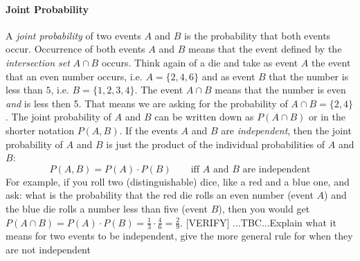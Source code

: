 \paragraph{Joint Probability}
A \emph{joint probability} of two events $A$ and $B$ is the probability that both events occur. Occurrence of both events $A$ and $B$ means that the event defined by the \emph{intersection set} $A \cap B$ occurs. Think again of a die and take as event $A$ the event that an even number occurs, i.e. $A = \{2,4,6\}$ and as event $B$ that the number is less than $5$, i.e. $B = \{1,2,3,4\}$. The event $A \cap B$ means that the number is even \emph{and} is less then 5. That means we are asking for the probability of $A \cap B = \{2,4\}$. The joint probability of $A$ and $B$ can be written down as $P(A \cap B)$ or in the shorter notation $P(A,B)$. If the events $A$ and $B$ are \emph{independent}, then the joint probability of $A$ and $B$ is just the product of the individual probabilities of $A$ and $B$: 
\begin{equation}
 P(A, B) = P(A) \cdot P(B) \qquad \text{iff $A$ and $B$ are independent}
\end{equation}
For example, if you roll two (distinguishable) dice, like a red  and a blue one, and ask: what is the probability that the red die rolls an even number (event $A$) and the blue die rolls a number less than five (event $B$), then you would get $P(A \cap B) = P(A) \cdot P(B) = \frac{1}{3} \cdot \frac{4}{6} = \frac{2}{9}$. [VERIFY] ...TBC...Explain what it means for two events to be independent, give the more general rule for when they are not independent 






